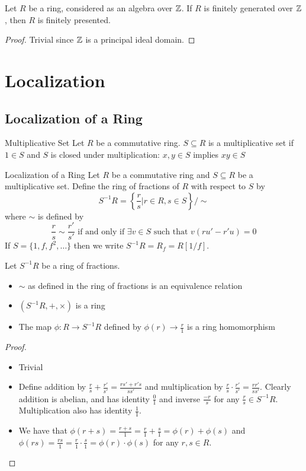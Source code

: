\documentclass[a4paper]{article}
\begin{document}
\begin{lmm}{}{} Let $R$ be a ring, considered as an algebra over $\mathbb{Z}$. If $R$ is finitely generated over $\mathbb{Z}$, then $R$ is finitely presented. \tcbline
\begin{proof}
Trivial since $\mathbb{Z}$ is a principal ideal domain. 
\end{proof}
\end{lmm}

\pagebreak
\section{Localization}
\subsection{Localization of a Ring}
\begin{defn}{Multiplicative Set}{} Let $R$ be a commutative ring. $S\subseteq R$ is a multiplicative set if $1\in S$ and $S$ is closed under multiplication: $x,y\in S$ implies $xy\in S$
\end{defn}

\begin{defn}{Localization of a Ring}{} Let $R$ be a commutative ring and $S\subseteq R$ be a multiplicative set. Define the ring of fractions of $R$ with respect to $S$ by $$S^{-1}R=\left\{\frac{r}{s}|r\in R,s\in S\right\}/\sim$$ where $\sim$ is defined by $$\frac{r}{s}\sim\frac{r'}{s'}\text{ if and only if }\exists v\in S\text{ such that }v(ru'-r'u)=0$$
If $S=\{1,f,f^2,\dots\}$ then we write $S^{-1}R=R_f=R[1/f]$. 
\end{defn}

\begin{prp}{}{} Let $S^{-1}R$ be a ring of fractions. 
\begin{itemize}
\item $\sim$ as defined in the ring of fractions is an equivalence relation
\item $(S^{-1}R,+,\times)$ is a ring
\item The map $\phi:R\to S^{-1}R$ defined by $\phi(r)\to\frac{r}{1}$ is a ring homomorphism
\end{itemize}\tcbline
\begin{proof}~\\
\begin{itemize}
\item Trivial
\item Define addition by $\frac{r}{s}+\frac{r'}{s'}=\frac{rs'+r's}{ss'}$ and multiplication by $\frac{r}{s}\cdot\frac{r'}{s'}=\frac{rr'}{ss'}$. Clearly addition is abelian, and has identity $\frac{0}{1}$ and inverse $\frac{-r}{s}$ for any $\frac{r}{s}\in S^{-1}R$. Multiplication also has identity $\frac{1}{1}$. 
\item We have that $\phi(r+s)=\frac{r+s}{1}=\frac{r}{1}+\frac{s}{1}=\phi(r)+\phi(s)$ and $\phi(rs)=\frac{rs}{1}=\frac{r}{1}\cdot\frac{s}{1}=\phi(r)\cdot\phi(s)$ for any $r,s\in R$. 
\end{itemize}
\end{proof}
\end{prp}
\end{document}
